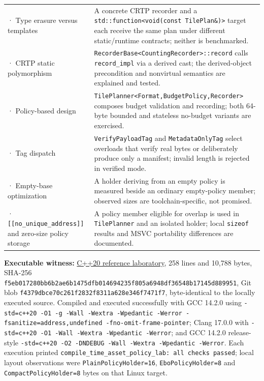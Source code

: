 {\begin{longtable}[]{@{}
  >{\raggedright\arraybackslash}p{}
  >{\raggedright\arraybackslash}p{}@{}}
225 · Type erasure versus templates & A concrete CRTP recorder and a \texttt{std::function\textless{}void(const\ TilePlan\&)\textgreater{}} target each receive the same plan under different static/runtime contracts; neither is benchmarked. \\
226 · CRTP static polymorphism & \texttt{RecorderBase\textless{}CountingRecorder\textgreater{}::record} calls \texttt{record\_impl} via a derived cast; the derived-object precondition and nonvirtual semantics are explained and tested. \\
227 · Policy-based design & \texttt{TilePlanner\textless{}Format,BudgetPolicy,Recorder\textgreater{}} composes budget validation and recording; both 64-byte bounded and stateless no-budget variants are exercised. \\
228 · Tag dispatch & \texttt{VerifyPayloadTag} and \texttt{MetadataOnlyTag} select overloads that verify real bytes or deliberately produce only a manifest; invalid length is rejected in verified mode. \\
229 · Empty-base optimization & A holder deriving from an empty policy is measured beside an ordinary empty-policy member; observed sizes are toolchain-specific, not promised. \\
230 · \texttt{{[}{[}no\_unique\_address{]}{]}} and zero-size policy storage & A policy member eligible for overlap is used in \texttt{TilePlanner} and an isolated holder; local \texttt{sizeof} results and MSVC portability differences are documented. \\
\end{longtable}
}

\textbf{Executable witness:} \hyperref[source-file-f5eb017280bb6b2ae6b1475d]{C++20 reference laboratory}, 258 lines and 10,788 bytes, SHA-256 \texttt{f5eb017280bb6b2ae6b1475dfb014694235f805a6948df36548b17145d889951}, Git blob \texttt{f4379dbce70c261f2832f8311a628e346f7471f7}, byte-identical to the locally executed source. Compiled and executed successfully with GCC 14.2.0 using \texttt{-std=c++20\ -O1\ -g\ -Wall\ -Wextra\ -Wpedantic\ -Werror\ -fsanitize=address,undefined\ -fno-omit-frame-pointer}; Clang 17.0.0 with \texttt{-std=c++20\ -O1\ -Wall\ -Wextra\ -Wpedantic\ -Werror}; and GCC 14.2.0 release-style \texttt{-std=c++20\ -O2\ -DNDEBUG\ -Wall\ -Wextra\ -Wpedantic\ -Werror}. Each execution printed \texttt{compile\_time\_asset\_policy\_lab:\ all\ checks\ passed}; local layout observations were \texttt{PlainPolicyHolder=16}, \texttt{EboPolicyHolder=8} and \texttt{CompactPolicyHolder=8} bytes on that Linux target.


